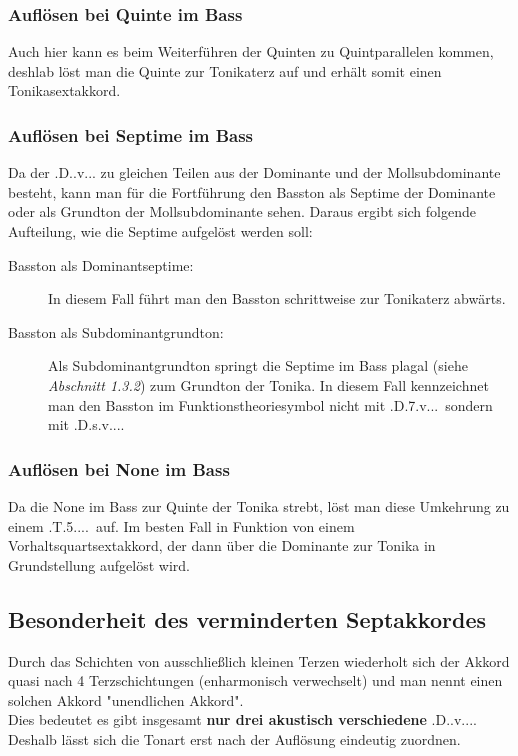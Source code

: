 \documentclass[a4paper]{article}
\newcommand{\TQS}{\HH.T.5....}
\newcommand{\Dhoch}[2]{\HH.D.#2.#1...}
\begin{document}
	\subsubsection{Auflösen bei Quinte im Bass}
	Auch hier kann es beim Weiterführen der Quinten zu Quintparallelen kommen, deshlab löst man die Quinte zur Tonikaterz auf und erhält somit einen Tonikasextakkord.
	
	\subsubsection{Auflösen bei Septime im Bass}
	Da der \Dhoch{v}{} zu gleichen Teilen aus der Dominante und der Mollsubdominante besteht, kann man für die Fortführung den Basston als Septime der Dominante oder als Grundton der Mollsubdominante sehen. Daraus ergibt sich folgende Aufteilung, wie die Septime aufgelöst werden soll:
	\begin{description}
		\item[Basston als Dominantseptime:] In diesem Fall führt man den Basston schrittweise zur Tonikaterz abwärts.
		\item[Basston als Subdominantgrundton:] Als Subdominantgrundton springt die Septime im Bass plagal (siehe \textit{Abschnitt 1.3.2}) zum Grundton der Tonika. In diesem Fall kennzeichnet man den Basston im Funktionstheoriesymbol nicht mit \Dhoch{v}{7}\ sondern mit \Dhoch{v}{s}.
	\end{description}

	\subsubsection{Auflösen bei None im Bass}
	Da die None im Bass zur Quinte der Tonika strebt, löst man diese Umkehrung zu einem \TQS\ auf. Im besten Fall in Funktion von einem Vorhaltsquartsextakkord, der dann über die Dominante zur Tonika in Grundstellung aufgelöst wird.
	
	\subsection{Besonderheit des verminderten Septakkordes}
	Durch das Schichten von ausschließlich kleinen Terzen wiederholt sich der Akkord quasi nach 4 Terzschichtungen (enharmonisch verwechselt) und man nennt einen solchen Akkord "{}unendlichen Akkord".\\
	Dies bedeutet es gibt insgesamt \textbf{nur drei akustisch verschiedene} \Dhoch{v}{}.\\
	Deshalb lässt sich die Tonart erst nach der Auflösung eindeutig zuordnen.
	
\end{document}
